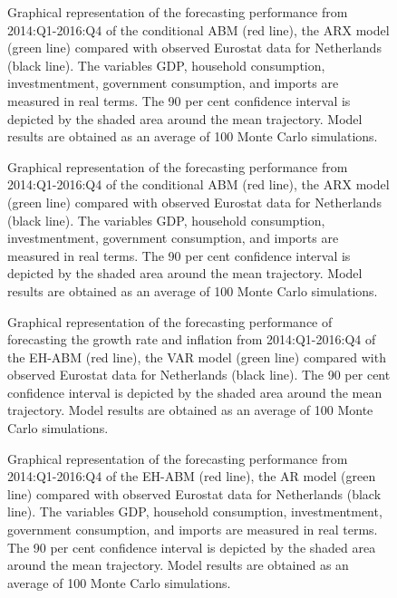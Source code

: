 \begin{figure}[!h]
	\centering
	
	\caption{Graphical representation of the forecasting performance from 2014:Q1-2016:Q4 of the conditional ABM (red line), the ARX model (green line) compared with observed Eurostat data for Netherlands (black line). The variables GDP, household consumption, investmentment, government consumption, and imports are measured in real terms. The 90 per cent confidence interval is depicted by the shaded area around the mean trajectory. Model results are obtained as an average of 100 Monte Carlo simulations.}     \label{fig:gvamacro_gvaetal_y}
\end{figure}

\begin{figure}[!h]
	\centering
	
 \caption{Graphical representation of the forecasting performance from 2014:Q1-2016:Q4 of the conditional ABM (red line), the ARX model (green line) compared with observed Eurostat data for Netherlands (black line). The variables GDP, household consumption, investmentment, government consumption, and imports are measured in real terms. The 90 per cent confidence interval is depicted by the shaded area around the mean trajectory. Model results are obtained as an average of 100 Monte Carlo simulations.}
  \label{fig:gvamacro_gvaetal_y}
\end{figure}


\begin{figure}[!h]
	\centering
	
 \caption{ Graphical representation of the forecasting performance of forecasting the growth rate and inflation from 2014:Q1-2016:Q4 of the EH-ABM (red line), the VAR model (green line) compared with observed Eurostat data for Netherlands (black line). The 90 per cent confidence interval is depicted by the shaded area around the mean trajectory. Model results are obtained as an average of 100 Monte Carlo simulations.}
   \label{fig:gvamacro_growthinflation_yq}
\end{figure}

\begin{figure}[!h]
	\centering
	
	\caption{Graphical representation of the forecasting performance from 2014:Q1-2016:Q4 of the EH-ABM (red line), the AR model (green line) compared with observed Eurostat data for Netherlands (black line). The variables GDP, household consumption, investmentment, government consumption, and imports are measured in real terms. The 90 per cent confidence interval is depicted by the shaded area around the mean trajectory. Model results are obtained as an average of 100 Monte Carlo simulations.}     \label{fig:gvamacro_gvaetal_y}
\end{figure}


